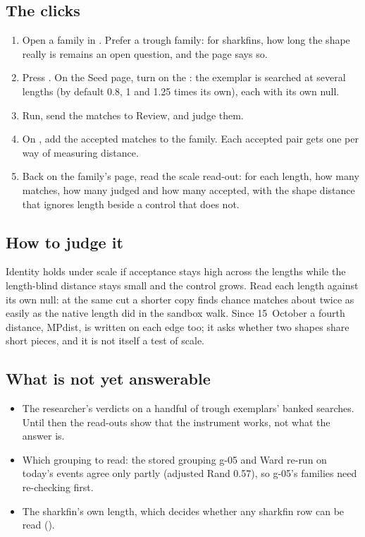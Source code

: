 \subsection*{The clicks}
\begin{enumerate}
\item Open a family in . Prefer a trough family: for sharkfins, how
  long the shape really is remains an open question, and the page says so.
\item Press . On the Seed page, turn on the : the
  exemplar is searched at several lengths (by default 0.8, 1 and 1.25 times its own), each
  with its own null.
\item Run, send the matches to Review, and judge them.
\item On , add the accepted matches to the family. Each accepted pair
  gets one  per way of measuring distance.
\item Back on the family's page, read the scale read-out: for each length, how many matches,
  how many judged and how many accepted, with the shape distance that ignores length beside a
  control that does not.
\end{enumerate}

\subsection*{How to judge it}
Identity holds under scale if acceptance stays high across the lengths while the length-blind
distance stays small and the control grows. Read each length against its own null: at the
same cut a shorter copy finds chance matches about twice as easily as the native length did
in the sandbox walk. Since 15~October a fourth distance, MPdist, is written on each edge too;
it asks whether two shapes share short pieces, and it is not itself a test of scale.

\subsection*{What is not yet answerable}
\begin{itemize}
\item The researcher's verdicts on a handful of trough exemplars' banked searches. Until then
  the read-outs show that the instrument works, not what the answer is.
\item Which grouping to read: the stored grouping g-05 and Ward re-run on today's events agree
  only partly (adjusted Rand 0.57), so g-05's families need re-checking first.
\item The sharkfin's own length, which decides whether any sharkfin row can be read
  ().
\end{itemize}

